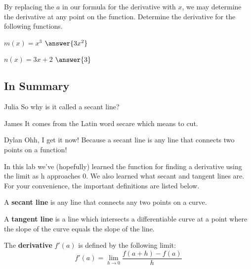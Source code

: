 \documentclass[handout]{ximera}
\begin{document}
By replacing the $a$ in our formula for the derivative with $x$, we may determine the derivative at any point on the function. Determine the derivative for the following functions.
\begin{question}
$m(x) = x^3$ $\answer{3x^2}$
\end{question}
\begin{question}
$n(x) = 3x+2$ $\answer{3}$
\end{question}


\subsection{In Summary}
\begin{dialogue}
\item[Julia] So why is it called a secant line?
\item[James] It comes from the Latin word secare which means to cut.
\item[Dylan] Ohh, I get it now! Because a secant line is any line that connects two points on a function!
\end{dialogue}
In this lab we've (hopefully) learned the function for finding a derivative using the limit as h approaches 0. We also learned what secant and tangent lines are. For your convenience, the important definitions are listed below. 
\begin{definition}
 A \textbf{secant line} is any line that connects any two points on a curve.
\end{definition}
\begin{definition}
A \textbf{tangent line} is a line which intersects a differentiable curve at a point where the slope of the curve equals the slope of the line.
\end{definition}
\begin{definition}
The \textbf{derivative} $f'(a)$ is defined by the following limit:
$$f'(a)=\displaystyle \lim_{h\rightarrow 0} \frac{f(a+h)-f(a)}{h}$$
\end{definition}
\end{document}
